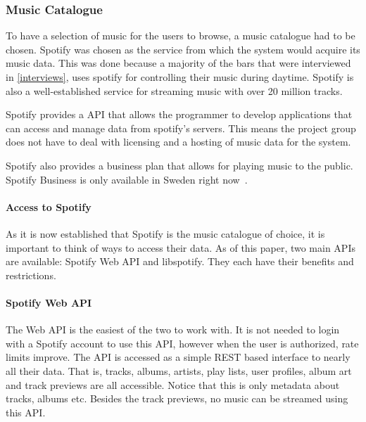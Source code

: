 \subsubsection{Music Catalogue}
\label{ssub:Music_catalog}
To have a selection of music for the users to browse, a music catalogue had to be chosen. Spotify was chosen as the service from which the system would acquire its music data. This was done because a majority of the bars that were interviewed in \cref{interviews}, uses spotify for controlling their music during daytime. Spotify is also a well-established service for streaming music with over 20 million tracks.

Spotify provides a API that allows the programmer to develop applications that can access and manage data from spotify’s servers. This means the project group does not have to deal with licensing and a hosting of music data for the system.

Spotify also provides a business plan that allows for playing music to the public. Spotify Business is only available in Sweden right now~\cite{spotifyBusiness}.


\paragraph{Access to Spotify}
\label{par:Access_to_Spotify}

As it is now established that Spotify is the music catalogue of choice, it is important to think of ways to access their data. As of this paper, two main APIs are available: Spotify Web API and libspotify. They each have their benefits and restrictions.

\paragraph{Spotify Web API}
\label{par:spotify_web_api}

The Web API is the easiest of the two to work with. It is not needed to login with a Spotify account to use this API, however when the user is authorized, rate limits improve. The API is accessed as a simple REST based interface to nearly all their data. That is, tracks, albums, artists, play lists, user profiles, album art and track previews are all accessible. Notice that this is only metadata about tracks, albums etc. Besides the track previews, no music can be streamed using this API.

